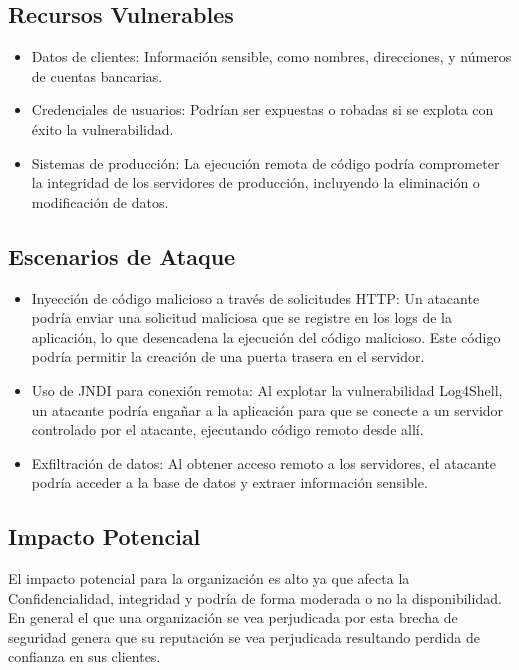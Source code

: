 \documentclass[stu, 11pt, letterpaper, donotrepeattitle, floatsintext, natbib]{apa7}
\begin{document}
\subsection{Recursos Vulnerables}

\begin{itemize}
\item Datos de clientes: Información sensible, como nombres, direcciones, y números de cuentas bancarias.
\item Credenciales de usuarios: Podrían ser expuestas o robadas si se explota con éxito la vulnerabilidad.
\item Sistemas de producción: La ejecución remota de código podría comprometer la integridad de los servidores de producción, incluyendo la eliminación o modificación de datos.
\end{itemize}

\subsection{Escenarios de Ataque}

\begin{itemize}
\item Inyección de código malicioso a través de solicitudes HTTP: Un atacante podría enviar una solicitud maliciosa que se registre en los logs de la aplicación, lo que desencadena la ejecución del código malicioso. Este código podría permitir la creación de una puerta trasera en el servidor.
\item Uso de JNDI para conexión remota: Al explotar la vulnerabilidad Log4Shell, un atacante podría engañar a la aplicación para que se conecte a un servidor controlado por el atacante, ejecutando código remoto desde allí.
 \item Exfiltración de datos: Al obtener acceso remoto a los servidores, el atacante podría acceder a la base de datos y extraer información sensible.
\end{itemize}

\subsection{Impacto Potencial}

El impacto potencial para la organización es alto ya que afecta la Confidencialidad, integridad y podría de forma moderada o no la disponibilidad.
En general el que una organización se vea perjudicada por esta brecha de seguridad genera que su reputación se vea perjudicada resultando perdida de confianza en sus clientes. 
\end{document}
